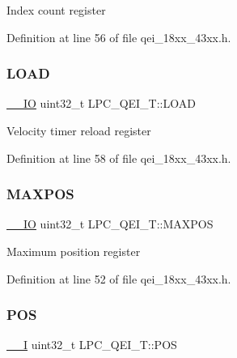 Index count register 

Definition at line 56 of file qei\+\_\+18xx\+\_\+43xx.\+h.

\mbox{\label{struct_l_p_c___q_e_i___t_aab13bc1fd1ecc6539d985d00a2beb756}} 
\subsubsection{\texorpdfstring{L\+O\+AD}{LOAD}}
{\footnotesize\ttfamily \hyperlink{core__sc300_8h_aec43007d9998a0a0e01faede4133d6be}{\+\_\+\+\_\+\+IO} uint32\+\_\+t L\+P\+C\+\_\+\+Q\+E\+I\+\_\+\+T\+::\+L\+O\+AD}

Velocity timer reload register 

Definition at line 58 of file qei\+\_\+18xx\+\_\+43xx.\+h.

\mbox{\label{struct_l_p_c___q_e_i___t_acaf54ed95adb4553f8be314b509f786b}} 
\subsubsection{\texorpdfstring{M\+A\+X\+P\+OS}{MAXPOS}}
{\footnotesize\ttfamily \hyperlink{core__sc300_8h_aec43007d9998a0a0e01faede4133d6be}{\+\_\+\+\_\+\+IO} uint32\+\_\+t L\+P\+C\+\_\+\+Q\+E\+I\+\_\+\+T\+::\+M\+A\+X\+P\+OS}

Maximum position register 

Definition at line 52 of file qei\+\_\+18xx\+\_\+43xx.\+h.

\mbox{\label{struct_l_p_c___q_e_i___t_a400314449370eff087c3c5e1e1c31cc1}} 
\subsubsection{\texorpdfstring{P\+OS}{POS}}
{\footnotesize\ttfamily \hyperlink{core__sc300_8h_af63697ed9952cc71e1225efe205f6cd3}{\+\_\+\+\_\+I} uint32\+\_\+t L\+P\+C\+\_\+\+Q\+E\+I\+\_\+\+T\+::\+P\+OS}

